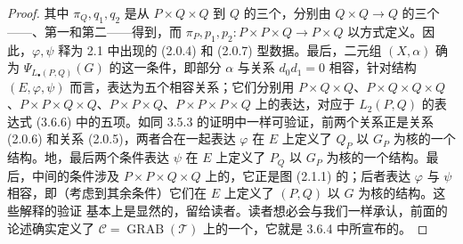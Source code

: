 \begin{proof}
其中 $\pi_Q,q_1,q_2$ 是从 $P\times Q\times Q$ 到 $Q$ 的三个，分别由 $Q\times Q\to Q$ 的三个——、第一和第二——得到，而 $\pi_P,p_1,p_2:P\times P\times Q\to P\times Q$ 以方式定义。因此，$\varphi,\psi$ 释为 2.1 中出现的 (2.0.4) 和 (2.0.7) 型数据。最后，二元组 $(X,\alpha)$ 确为 $\Psi_{L_\bullet(P,Q)}(G)$ 的这一条件，即部分 $\alpha$ 与关系 $d_0d_1=0$ 相容，针对结构 $(E,\varphi,\psi)$ 而言，表达为五个相容关系；它们分别用 $P\times Q\times Q$、$P\times Q\times Q\times Q$、$P\times P\times Q\times Q$、$P\times P\times Q$、$P\times P\times P\times Q$ 上的表达，对应于 $L_2(P,Q)$ 的表达式 (3.6.6) 中的五项。如同 3.5.3 的证明中一样可验证，前两个关系正是关系 (2.0.6) 和关系 (2.0.5)，两者合在一起表达 $\varphi$ 在 $E$ 上定义了 $Q_P$ 以 $G_P$ 为核的一个结构。地，最后两个条件表达 $\psi$ 在 $E$ 上定义了 $P_Q$ 以 $G_P$ 为核的一个结构。最后，中间的条件涉及 $P\times P\times Q\times Q$ 上的，它正是图 (2.1.1) 的；后者表达 $\varphi$ 与 $\psi$ 相容，即（考虑到其余条件）它们在 $E$ 上定义了 $(P,Q)$ 以 $G$ 为核的结构。这些解释的验证
基本上是显然的，留给读者。读者想必会与我们一样承认，前面的论述确实定义了 $\mathcal C=\operatorname{GRAB}(\mathcal T)$ 上的一个，它就是 3.6.4 中所宣布的。
\end{proof}

